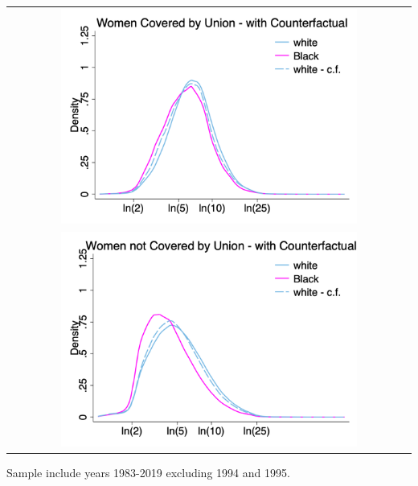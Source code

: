 \documentclass[11pt]{article}
\begin{document}
{\pagebreak
\begin{table}[h!]
    \centering
    \label{fig:dfl_women}
    \begin{tabular}{c}
          \includegraphics[width = 0.75\textwidth, keepaspectratio]{figures/kde1wom/fin_cu_bhw_wom.png} \\
          \includegraphics[width = 0.75\textwidth, keepaspectratio]{figures/kde1wom/fin_cn_bhw_wom.png}
    \end{tabular}
\end{table}
\footnotesize{Sample include years 1983-2019 excluding 1994 and 1995.}

}
\end{document}
